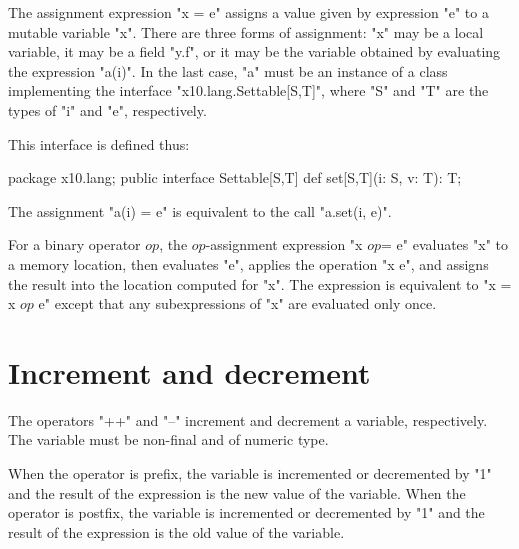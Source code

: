 The assignment expression \xcd"x = e" assigns a value given by
expression \xcd"e"
to a mutable variable \xcd"x".  There are three forms of
assignment: \xcd"x" may be a local variable, it may be a field
\xcd"y.f", or it may be the variable obtained by evaluating the expression \xcd"a(i)".
In the last case, \xcd"a" must be an instance of a class implementing the interface
 \xcd"x10.lang.Settable[S,T]", where 
\xcd"S" and \xcd"T" are the types of \xcd"i" and \xcd"e", respectively.

This interface is defined thus:
\begin{xten}
package x10.lang;
public interface Settable[S,T] {
    def set[S,T](i: S, v: T): T;
}
\end{xten}
The assignment \xcd"a(i) = e" is equivalent to the call
\xcd"a.set(i, e)".


For a binary operator
$\mathit{op}$,
the
$\mathit{op}$-assignment expression \xcdmath"x $\mathit{op}$= e"
evaluates \xcd"x" to a memory location, then evaluates \xcd"e",
applies the operation \xcdmath"x  e", and assigns the
result into the location computed for \xcd"x".
The expression is equivalent to \xcdmath"x = x $\mathit{op}$ e"
except that any subexpressions of \xcd"x" are evaluated only
once.


%


\section{Increment and decrement}

The operators \xcd"++" and \xcd"--" increment and decrement
a variable, respectively.  The variable must be non-final
and of numeric type.

When the operator is prefix, the variable is
incremented or decremented by \xcd"1" and the result of the expression is
the new value of the variable.
When the operator is postfix, the variable is incremented or
decremented by \xcd"1" and the result of the expression is the old value of
the variable.

